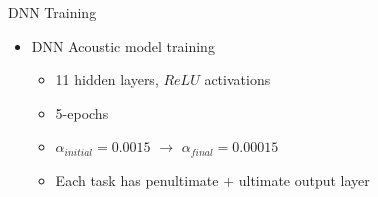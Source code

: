 \documentclass[final]{beamer} %
\newlength{\columnheight}
\begin{document}
\begin{frame}
\begin{columns}
\begin{column}{0.3\textwidth}
{        \vspace{.5cm}  

        \begin{block}{\boxnumber DNN Training}          
          \begin{itemize}    
          \item DNN Acoustic model training
            \begin{itemize}
            \item 11 hidden layers, $ReLU$ activations
            \item 5-epochs
            \item $\alpha_{initial}=0.0015$ $\rightarrow$ $\alpha_{final}=0.00015$
            \item Each task has penultimate + ultimate output layer
            \end{itemize}
          \end{itemize}
        \end{block}
        \vspace{.5cm}
       
      } %
    \end{column}
    
    \begin{column}{0.3\textwidth}
      \parbox[t][\columnheight]{.9\textwidth}{

        \vspace{.5cm}               %

}
\end{column}
\end{columns}
\end{frame}
\end{document}
